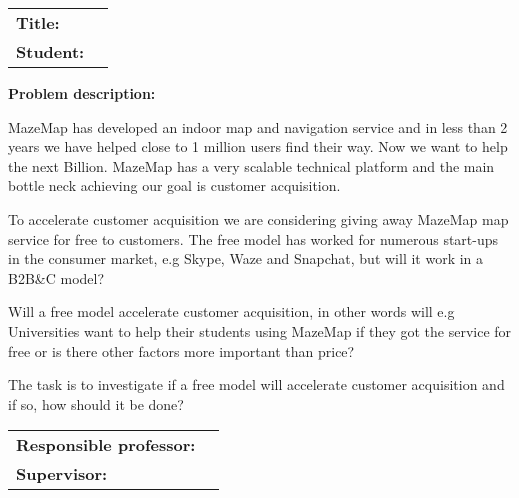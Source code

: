 \begin{titlingpage}

\noindent
\begin{tabular}{@{}p{2cm}l}
\textbf{Title:} 	& \thetitle \\
\textbf{Student:}	& \theauthor \\
\end{tabular}

\vspace{4ex}
\noindent\textbf{Problem description:}
\vspace{2ex}


MazeMap has developed an indoor map and navigation service and in less than 2 years we have helped close to 1 million users find their way. Now we want to help the next Billion. MazeMap has a very scalable technical platform and the main bottle neck achieving our goal is customer acquisition. 

To accelerate customer acquisition we are considering giving away MazeMap map service for free to customers. The free model has worked for numerous start-ups in the consumer market, e.g Skype, Waze and Snapchat, but will it work in a B2B&C model?

Will a free model accelerate customer acquisition, in other words will e.g Universities want to help their students using MazeMap if they got the service for free or is there other factors more important than price? 

The task is to investigate if a free model will accelerate customer acquisition and if so, how should it be done?
\vspace{6ex}

\noindent
\begin{tabular}{@{}p{4cm}l}
\textbf{Responsible professor:} 	& \theprofessor \\
\textbf{Supervisor:}			& \thesupervisor \\
\end{tabular}

\end{titlingpage}